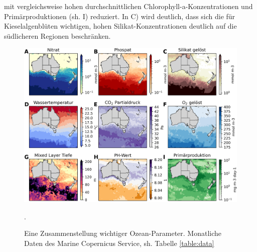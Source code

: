 \documentclass[12pt,a4paper,onecolumn,headheight=30pt]{scrartcl}
\begin{document}
mit vergleichsweise hohen durchschnittlichen Chlorophyll-a-Konzentrationen und Primärproduktionen (sh. I) reduziert. In C) wird deutlich, dass sich die für Kieselalgenblüten wichtigen, hohen Silikat-Konzentrationen deutlich auf die südlicheren Regionen beschränken.
\begin{figure}[htbp]
\includegraphics[width=\textwidth]{bilder/factors_collage.png}
\caption{Eine Zusammenstellung wichtiger Ozean-Parameter. Monatliche Daten des  Marine Copernicus Service, sh. Tabelle \ref{table:data}}. \label{fig:factors_collage}
\end{figure}
\end{document}
